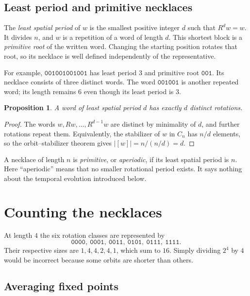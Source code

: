 \documentclass[11pt]{article}
\newtheorem{proposition}{Proposition}[section]
\theoremstyle{definition}
\newcommand{\word}[1]{\mathtt{#1}}
\numberwithin{equation}{section}
\begin{document}
\subsection{Least period and primitive necklaces}

The \emph{least spatial period} of $w$ is the smallest positive integer
$d$ such that $R^d w=w$. It divides $n$, and $w$ is a repetition of a
word of length $d$. This shortest block is a \emph{primitive root} of
the written word. Changing the starting position rotates that root, so
its necklace is well defined independently of the representative.

For example, $\word{001001001001}$ has least period $3$ and primitive
root $\word{001}$. Its necklace consists of three distinct words.
The word $\word{001001}$ is another repeated word; its length remains
$6$ even though its least period is $3$.

\begin{proposition}\label{prop:orbit-size}
A word of least spatial period $d$ has exactly $d$ distinct rotations.
\end{proposition}
\begin{proof}
The words $w,Rw,\ldots,R^{d-1}w$ are distinct by minimality of $d$,
and further rotations repeat them. Equivalently, the stabilizer of $w$
in $C_n$ has $n/d$ elements, so the orbit--stabilizer theorem gives
$|[w]|=n/(n/d)=d$.
\end{proof}

A necklace of length $n$ is \emph{primitive}, or \emph{aperiodic}, if
its least spatial period is $n$. Here ``aperiodic'' means that no smaller
rotational period exists. It says nothing about the temporal evolution
introduced below.

\section{Counting the necklaces}\label{sec:counting}

At length $4$ the six rotation classes are represented by
\[
 \word{0000},\ \word{0001},\ \word{0011},\
 \word{0101},\ \word{0111},\ \word{1111}.
\]
Their respective sizes are $1,4,4,2,4,1$, which sum to $16$.
Simply dividing $2^4$ by $4$ would be incorrect because some orbits
are shorter than others.

\subsection{Averaging fixed points}
\end{document}
